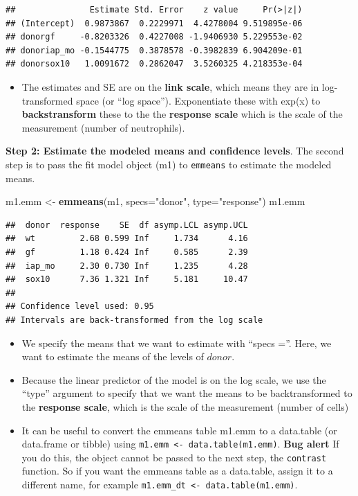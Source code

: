 \documentclass[]{book}
\newenvironment{Shaded}{\begin{snugshade}}{\end{snugshade}}
\newcommand{\DataTypeTok}[1]{\textcolor[rgb]{0.13,0.29,0.53}{#1}}
\newcommand{\KeywordTok}[1]{\textcolor[rgb]{0.13,0.29,0.53}{\textbf{#1}}}
\newcommand{\NormalTok}[1]{#1}
\newcommand{\StringTok}[1]{\textcolor[rgb]{0.31,0.60,0.02}{#1}}
\providecommand{\tightlist}{%
  \setlength{\itemsep}{0pt}\setlength{\parskip}{0pt}}
\begin{document}
\begin{verbatim}
##               Estimate Std. Error    z value     Pr(>|z|)
## (Intercept)  0.9873867  0.2229971  4.4278004 9.519895e-06
## donorgf     -0.8203326  0.4227008 -1.9406930 5.229553e-02
## donoriap_mo -0.1544775  0.3878578 -0.3982839 6.904209e-01
## donorsox10   1.0091672  0.2862047  3.5260325 4.218353e-04
\end{verbatim}

\begin{itemize}
\tightlist
\item
  The estimates and SE are on the \textbf{link scale}, which means they are in log-transformed space (or ``log space''). Exponentiate these with exp(x) to \textbf{backstransform} these to the the \textbf{response scale} which is the scale of the measurement (number of neutrophils).
\end{itemize}

\textbf{Step 2: Estimate the modeled means and confidence levels}. The second step is to pass the fit model object (m1) to \texttt{emmeans} to estimate the modeled means.

\begin{Shaded}
\begin{Highlighting}[]
\NormalTok{m1.emm <-}\StringTok{ }\KeywordTok{emmeans}\NormalTok{(m1, }\DataTypeTok{specs=}\StringTok{"donor"}\NormalTok{, }\DataTypeTok{type=}\StringTok{"response"}\NormalTok{)}
\NormalTok{m1.emm}
\end{Highlighting}
\end{Shaded}

\begin{verbatim}
##  donor  response    SE  df asymp.LCL asymp.UCL
##  wt         2.68 0.599 Inf     1.734      4.16
##  gf         1.18 0.424 Inf     0.585      2.39
##  iap_mo     2.30 0.730 Inf     1.235      4.28
##  sox10      7.36 1.321 Inf     5.181     10.47
## 
## Confidence level used: 0.95 
## Intervals are back-transformed from the log scale
\end{verbatim}

\begin{itemize}
\tightlist
\item
  We specify the means that we want to estimate with ``specs =''. Here, we want to estimate the means of the levels of \(donor\).
\item
  Because the linear predictor of the model is on the log scale, we use the ``type'' argument to specify that we want the means to be backtransformed to the \textbf{response scale}, which is the scale of the measurement (number of cells)
\item
  It can be useful to convert the emmeans table m1.emm to a data.table (or data.frame or tibble) using \texttt{m1.emm\ \textless{}-\ data.table(m1.emm)}. \textbf{Bug alert} If you do this, the object cannot be passed to the next step, the \texttt{contrast} function. So if you want the emmeans table as a data.table, assign it to a different name, for example \texttt{m1.emm\_dt\ \textless{}-\ data.table(m1.emm)}.
\end{itemize}
\end{document}
